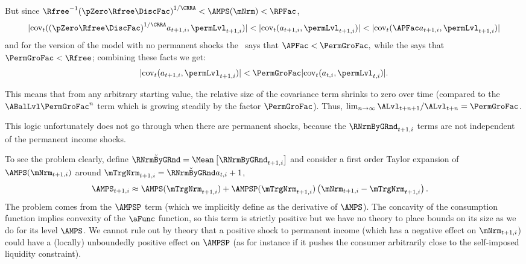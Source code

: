\documentclass[\econtexRoot/BufferStockTheory]{subfiles}
\begin{document}
But since ${\Rfree}^{-1}{(\pZero  \Rfree\DiscFac)}^{1/\CRRA} < \AMPS(\mNrm) < \RPFac $,
\begin{equation}
  |\mbox{cov}_{t}({(\pZero  \Rfree\DiscFac)}^{1/\CRRA}a_{t+1,i},\permLvl_{t+1,i})| <
  |\mbox{cov}_{t}(a_{t+1,i},\permLvl_{t+1,i})| <
  |\mbox{cov}_{t}({\APFac}a_{t+1,i},\permLvl_{t+1,i})| \nonumber
\end{equation}
and for the version of the model with no permanent shocks the \GICMod~says that ${\APFac} < \PermGroFac, $ while the {\FHWC} says that $\PermGroFac < \Rfree$; combining these facts we get:
\begin{equation}\begin{gathered}\begin{aligned}
  |\mbox{cov}_{t}(a_{t+1,i},\permLvl_{t+1,i})| < \PermGroFac
  |\mbox{cov}_{t}(a_{t,i},\permLvl_{t,i})|. \nonumber
\end{aligned}\end{gathered}\end{equation}

This means that from any arbitrary starting value, the relative size of the covariance term shrinks to zero over time (compared to the $\ABalLvl \PermGroFac^{n}$ term which is growing steadily by the factor $\PermGroFac$).
Thus, $\lim_{n \rightarrow \infty} \ALvl_{t+n+1}/\ALvl_{t+n} = \PermGroFac$.

This logic unfortunately does not go through when there are permanent shocks, because the $\RNrmByGRnd _{t+1,i}$ terms are not independent of the permanent income shocks.

To see the problem clearly, define $\breve{\RNrmByGRnd }=\Mean\left[\RNrmByGRnd _{t+1,i}\right]$ and consider a first order Taylor expansion of $\AMPS(\mNrm_{t+1,i})$ around $\mTrgNrm_{t+1,i}=\breve{\RNrmByGRnd } a_{t,i}+1$,
\begin{align*}
  \AMPS_{t+1,i} & \approx 
  \AMPS(\mTrgNrm_{t+1,i})+\AMPSP(\mTrgNrm_{t+1,i})\left(\mNrm_{t+1,i}-\mTrgNrm_{t+1,i}\right)
 \nonumber.
\end{align*}
The problem comes from the $\AMPSP$ term (which we implicitly define as the derivative of $\AMPS$).
The concavity of the consumption function implies convexity of the $\aFunc$ function, so this term is strictly positive but we have no theory to place bounds on its size as we do for its level $\AMPS$.
We cannot rule out by theory that a positive shock to permanent income (which has a negative effect on $\mNrm_{t+1,i}$) could have a (locally) unboundedly positive effect on $\AMPSP$ (as for instance if it pushes the consumer arbitrarily close to the self-imposed liquidity constraint).
\end{document}
